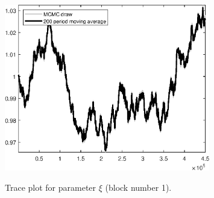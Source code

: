 \begin{figure}[H]
\centering
  \includegraphics[width=0.8\textwidth]{BRS_sectoral_wo_demand_shocks/graphs/TracePlot_xi_blck_1}\\
    \caption{Trace plot for parameter $\xi$ (block number 1).}
\end{figure}
